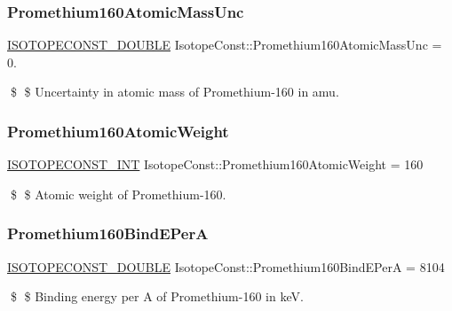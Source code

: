 \subsubsection{\texorpdfstring{Promethium160\+Atomic\+Mass\+Unc}{Promethium160AtomicMassUnc}}
{\footnotesize\ttfamily \mbox{\hyperlink{group___isotope_const-_macros_ga8f45a7272ce02c0b4c65c44636ed719a}{I\+S\+O\+T\+O\+P\+E\+C\+O\+N\+S\+T\+\_\+\+D\+O\+U\+B\+LE}} Isotope\+Const\+::\+Promethium160\+Atomic\+Mass\+Unc = 0.}

\$ \$ Uncertainty in atomic mass of Promethium-\/160 in amu. \mbox{\label{group___isotope_const-_promethium-_pm160_ga73cf0883eec6d0e695645b14fb930332}} 
\subsubsection{\texorpdfstring{Promethium160\+Atomic\+Weight}{Promethium160AtomicWeight}}
{\footnotesize\ttfamily \mbox{\hyperlink{group___isotope_const-_macros_ga5f18360b3e99483a35c32d789e62621c}{I\+S\+O\+T\+O\+P\+E\+C\+O\+N\+S\+T\+\_\+\+I\+NT}} Isotope\+Const\+::\+Promethium160\+Atomic\+Weight = 160}

\$ \$ Atomic weight of Promethium-\/160. \mbox{\label{group___isotope_const-_promethium-_pm160_ga89f91903ec60ec696605c807ff966181}} 
\subsubsection{\texorpdfstring{Promethium160\+Bind\+E\+PerA}{Promethium160BindEPerA}}
{\footnotesize\ttfamily \mbox{\hyperlink{group___isotope_const-_macros_ga8f45a7272ce02c0b4c65c44636ed719a}{I\+S\+O\+T\+O\+P\+E\+C\+O\+N\+S\+T\+\_\+\+D\+O\+U\+B\+LE}} Isotope\+Const\+::\+Promethium160\+Bind\+E\+PerA = 8104}

\$ \$ Binding energy per A of Promethium-\/160 in keV. \mbox{\label{group___isotope_const-_promethium-_pm160_ga74bd1267791257c1384c13648d06737b}} 

